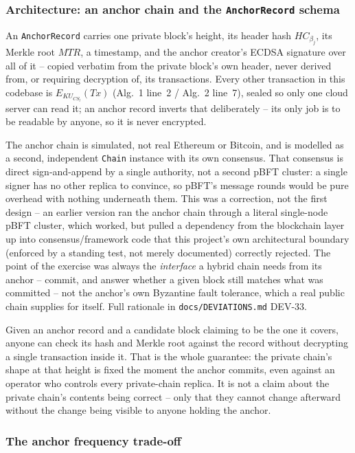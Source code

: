 \documentclass[conference]{IEEEtran}
\begin{document}
\subsubsection{Architecture: an anchor chain and the \texttt{AnchorRecord} schema}

An \texttt{AnchorRecord} carries one private block's height, its header hash $HC_{\beta_j}$, its
Merkle root $MTR$, a timestamp, and the anchor creator's ECDSA signature over all of it -- copied
verbatim from the private block's own header, never derived from, or requiring decryption of, its
transactions. Every other transaction in this codebase is $E_{KU_{CS_l}}(Tx)$ (Alg.~1 line~2 /
Alg.~2 line~7), sealed so only one cloud server can read it; an anchor record inverts that
deliberately -- its only job is to be readable by anyone, so it is never encrypted.

The anchor chain is simulated, not real Ethereum or Bitcoin, and is modelled as a second,
independent \texttt{Chain} instance with its own consensus. That consensus is direct
sign-and-append by a single authority, not a second pBFT cluster: a single signer has no other
replica to convince, so pBFT's message rounds would be pure overhead with nothing underneath them.
This was a correction, not the first design -- an earlier version ran the anchor chain through a
literal single-node pBFT cluster, which worked, but pulled a dependency from the blockchain layer
up into consensus/framework code that this project's own architectural boundary (enforced by a
standing test, not merely documented) correctly rejected. The point of the exercise was always the
\emph{interface} a hybrid chain needs from its anchor -- commit, and answer whether a given block
still matches what was committed -- not the anchor's own Byzantine fault tolerance, which a real
public chain supplies for itself. Full rationale in \texttt{docs/DEVIATIONS.md} DEV-33.

Given an anchor record and a candidate block claiming to be the one it covers, anyone can check
its hash and Merkle root against the record without decrypting a single transaction inside it.
That is the whole guarantee: the private chain's shape at that height is fixed the moment the
anchor commits, even against an operator who controls every private-chain replica. It is not a
claim about the private chain's contents being correct -- only that they cannot change afterward
without the change being visible to anyone holding the anchor.

\subsubsection{The anchor frequency trade-off}
\end{document}

